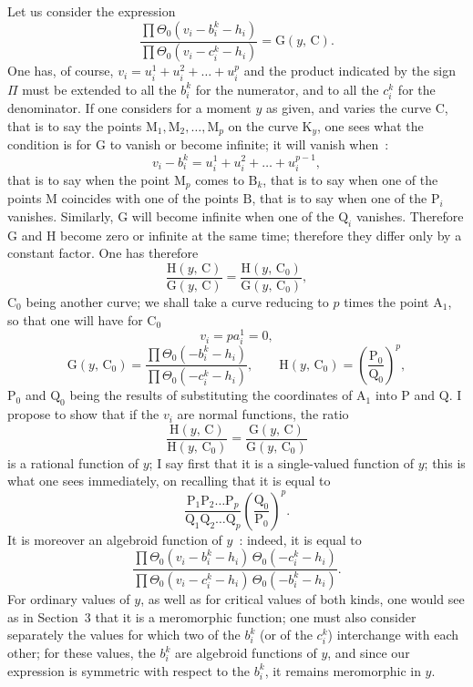 \documentclass{article}
\begin{document}
Let us consider the expression
\[
\frac{\prod \Theta_{0}(v_{i} - b_{i}^{k} - h_{i})}{\prod \Theta_{0}(v_{i} - c_{i}^{k} - h_{i})} = \mathrm{G}(y,\, \mathrm{C}).
\]
One has, of course, $v_{i} = u_{i}^{1} + u_{i}^{2} + \ldots + u_{i}^{p}$ and the product indicated by the sign $\Pi$ must be extended to all the $b_{i}^{k}$ for the numerator, and to all the $c_{i}^{k}$ for the denominator. If one considers for a moment $y$ as given, and varies the curve $\mathrm{C}$, that is to say the points $\mathrm{M}_{1}, \mathrm{M}_{2}, \ldots, \mathrm{M}_{p}$ on the curve $\mathrm{K}_{y}$, one sees what the condition is for $\mathrm{G}$ to vanish or become infinite; it will vanish when~:
\[
v_{i} - b_{i}^{k} = u_{i}^{1} + u_{i}^{2} + \ldots + u_{i}^{p-1},
\]
that is to say when the point $\mathrm{M}_{p}$ comes to $\mathrm{B}_{k}$, that is to say when one of the points $\mathrm{M}$ coincides with one of the points $\mathrm{B}$, that is to say when one of the $\mathrm{P}_{i}$ vanishes. Similarly, $\mathrm{G}$ will become infinite when one of the $\mathrm{Q}_{i}$ vanishes. Therefore $\mathrm{G}$
and $\mathrm{H}$ become zero or infinite at the same time; therefore they differ only by a constant factor. One has therefore
\[
\frac{\mathrm{H}(y,\, \mathrm{C})}{\mathrm{G}(y,\, \mathrm{C})} = \frac{\mathrm{H}(y,\, \mathrm{C}_{0})}{\mathrm{G}(y,\, \mathrm{C}_{0})},
\]
$\mathrm{C}_{0}$ being another curve; we shall take a curve reducing to $p$ times the point $\mathrm{A}_{1}$, so that one will have for $\mathrm{C}_{0}$
\[
v_{i} = p a_{i}^{1} = 0,
\]
\[
\mathrm{G}(y,\, \mathrm{C}_{0}) = \frac{\prod \Theta_{0}(- b_{i}^{k} - h_{i})}{\prod \Theta_{0}(- c_{i}^{k} - h_{i})}, \qquad \mathrm{H}(y,\, \mathrm{C}_{0}) = \left(\frac{\mathrm{P}_{0}}{\mathrm{Q}_{0}}\right)^{p},
\]
$\mathrm{P}_{0}$ and $\mathrm{Q}_{0}$ being the results of substituting the coordinates of $\mathrm{A}_{1}$ into $\mathrm{P}$ and $\mathrm{Q}$. I propose to show that if the $v_{i}$ are normal functions, the ratio
\[
\frac{\mathrm{H}(y,\, \mathrm{C})}{\mathrm{H}(y,\, \mathrm{C}_{0})} = \frac{\mathrm{G}(y,\, \mathrm{C})}{\mathrm{G}(y,\, \mathrm{C}_{0})}
\]
is a rational function of $y$; I say first that it is a single-valued function of $y$; this is what one sees immediately, on recalling that it is equal to
\[
\frac{\mathrm{P}_{1}\mathrm{P}_{2}\ldots\mathrm{P}_{p}}{\mathrm{Q}_{1}\mathrm{Q}_{2}\ldots\mathrm{Q}_{p}}\left(\frac{\mathrm{Q}_{0}}{\mathrm{P}_{0}}\right)^{p}.
\]
It is moreover an algebroid function of $y$~: indeed, it is equal to
\[
\frac{\prod \Theta_{0}(v_{i} - b_{i}^{k} - h_{i})\,\Theta_{0}(- c_{i}^{k} - h_{i})}{\prod \Theta_{0}(v_{i} - c_{i}^{k} - h_{i})\,\Theta_{0}(- b_{i}^{k} - h_{i})}.
\]
For ordinary values of $y$, as well as for critical values of both kinds, one would see as in Section~3 that it is a meromorphic function; one must also consider separately the values for which two of the $b_{i}^{k}$ (or of the $c_{i}^{k}$) interchange with each other; for these values, the $b_{i}^{k}$ are algebroid functions of $y$, and since our expression is symmetric with respect to the $b_{i}^{k}$, it remains meromorphic in $y$.
\end{document}
